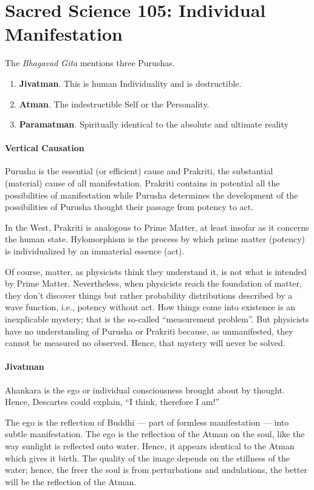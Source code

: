 \section{Sacred Science 105: Individual Manifestation}

The \emph{Bhagavad Gita} mentions three Purushas.

\begin{enumerate}
\item \textbf{Jivatman}. This is human Individuality and is destructible. 
\item \textbf{Atman}. The indestructible Self or the Personality. 
\item \textbf{Paramatman}. Spiritually identical to the absolute and ultimate reality 
\end{enumerate}
\paragraph{Vertical Causation}
Purusha is the essential (or efficient) cause and Prakriti, the substantial (material) cause of all manifestation. Prakriti contains in potential all the possibilities of manifestation while Purusha determines the development of the possibilities of Purusha thought their passage from potency to act.

In the West, Prakriti is analogous to Prime Matter, at least insofar as it concerns the human state. Hylomorphism is the process by which prime matter (potency) is individualized by an immaterial essence (act).

Of course, matter, as physicists think they understand it, is not what is intended by Prime Matter. Nevertheless, when physicists reach the foundation of matter, they don’t discover things but rather probability distributions described by a wave function, i.e., potency without act. How things come into existence is an inexplicable mystery; that is the so-called “measurement problem”. But physicists have no understanding of Purusha or Prakriti because, as unmanifested, they cannot be measured no observed. Hence, that mystery will never be solved.

\paragraph{Jivatman}
Ahankara is the ego or individual consciousness brought about by thought. Hence, Descartes could explain, “I think, therefore I am!”

The ego is the reflection of Buddhi — part of formless manifestation — into subtle manifestation. The ego is the reflection of the Atman on the soul, like the way sunlight is reflected onto water. Hence, it appears identical to the Atman which gives it birth. The quality of the image depends on the stillness of the water; hence, the freer the soul is from perturbations and undulations, the better will be the reflection of the Atman.

